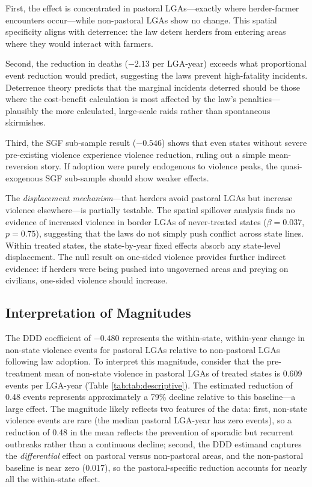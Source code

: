 \documentclass[12pt]{article}
\begin{document}
First, the effect is concentrated in pastoral LGAs---exactly where herder-farmer encounters occur---while non-pastoral LGAs show no change. This spatial specificity aligns with deterrence: the law deters herders from entering areas where they would interact with farmers.

Second, the reduction in deaths ($-2.13$ per LGA-year) exceeds what proportional event reduction would predict, suggesting the laws prevent high-fatality incidents. Deterrence theory predicts that the marginal incidents deterred should be those where the cost-benefit calculation is most affected by the law's penalties---plausibly the more calculated, large-scale raids rather than spontaneous skirmishes.

Third, the SGF sub-sample result ($-0.546$) shows that even states without severe pre-existing violence experience violence reduction, ruling out a simple mean-reversion story. If adoption were purely endogenous to violence peaks, the quasi-exogenous SGF sub-sample should show weaker effects.

The \textit{displacement mechanism}---that herders avoid pastoral LGAs but increase violence elsewhere---is partially testable. The spatial spillover analysis finds no evidence of increased violence in border LGAs of never-treated states ($\beta = 0.037$, $p = 0.75$), suggesting that the laws do not simply push conflict across state lines. Within treated states, the state-by-year fixed effects absorb any state-level displacement. The null result on one-sided violence provides further indirect evidence: if herders were being pushed into ungoverned areas and preying on civilians, one-sided violence should increase.

\subsection{Interpretation of Magnitudes}

The DDD coefficient of $-0.480$ represents the within-state, within-year change in non-state violence events for pastoral LGAs relative to non-pastoral LGAs following law adoption. To interpret this magnitude, consider that the pre-treatment mean of non-state violence in pastoral LGAs of treated states is 0.609 events per LGA-year (Table \ref{tab:tab:descriptive}). The estimated reduction of 0.48 events represents approximately a 79\% decline relative to this baseline---a large effect. The magnitude likely reflects two features of the data: first, non-state violence events are rare (the median pastoral LGA-year has zero events), so a reduction of 0.48 in the mean reflects the prevention of sporadic but recurrent outbreaks rather than a continuous decline; second, the DDD estimand captures the \textit{differential} effect on pastoral versus non-pastoral areas, and the non-pastoral baseline is near zero (0.017), so the pastoral-specific reduction accounts for nearly all the within-state effect.
\end{document}
